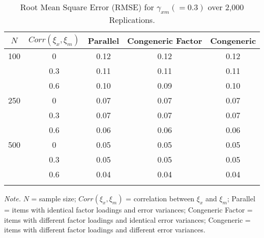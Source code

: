 \documentclass[
  man, donotrepeattitle]{apa6}
\begin{document}
\begin{table}[tbp]

\begin{center}
\begin{threeparttable}

\caption{\label{tab:rmse}Root Mean Square Error (RMSE) for $\gamma_{xm} (= 0.3)$ over 2,000 Replications.}

\begin{tabular}{ccccc}
\toprule
$\textit{N}$ & \multicolumn{1}{c}{$Corr(\xi_{x}, \xi_{m})$} & \multicolumn{1}{c}{Parallel} & \multicolumn{1}{c}{Congeneric Factor} & \multicolumn{1}{c}{Congeneric}\\
\midrule
100 & 0 & 0.12 & 0.12 & 0.12\\
 & 0.3 & 0.11 & 0.11 & 0.11\\
 & 0.6 & 0.10 & 0.09 & 0.10\\
250 & 0 & 0.07 & 0.07 & 0.07\\
 & 0.3 & 0.07 & 0.07 & 0.07\\
 & 0.6 & 0.06 & 0.06 & 0.06\\
500 & 0 & 0.05 & 0.05 & 0.05\\
 & 0.3 & 0.05 & 0.05 & 0.05\\
 & 0.6 & 0.04 & 0.04 & 0.04\\
\bottomrule
\addlinespace
\end{tabular}

\begin{tablenotes}[para]
\normalsize{\textit{Note.} $\textit{N}$ = sample size; $Corr(\xi_{x}, \xi_{m})$ = correlation between $\xi_{x}$ and $\xi_{m}$; Parallel = items with identical factor loadings and error variances; Congeneric Factor = items with different factor loadings and identical error variances; Congeneric = items with different factor loadings and different error variances.}
\end{tablenotes}

\end{threeparttable}
\end{center}

\end{table}
\end{document}
